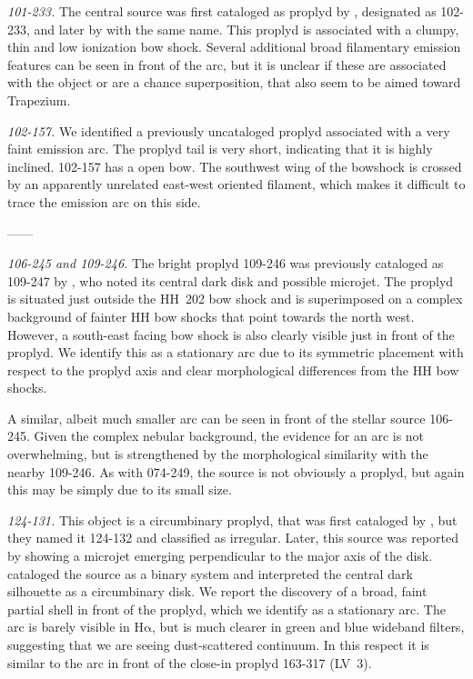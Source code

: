 \documentclass[iop, apj]{emulateapj}
\newcommand\ha{\ensuremath{\mathrm{H\alpha}}}
\begin{document}
\textit{101-233.} The central source was first cataloged as proplyd by \citet{ODell:1996a}, designated as 102-233, and later by \citet{Ricci:2008a} with the same name. This proplyd is associated with a clumpy, thin and low ionization bow shock. Several additional broad filamentary emission features can be seen in front of the arc, but it is unclear if these are associated with the object or are a chance superposition, that also seem to be aimed toward Trapezium. 

\textit{102-157.} We identified a previously uncataloged proplyd associated with a very faint emission arc. The proplyd tail is very short, indicating that it is highly inclined. 102-157 has a open bow. The southwest wing of the bowshock is crossed by an apparently unrelated east-west oriented filament, which makes it difficult to trace the emission arc on this side.

------

\textit{106-245 and 109-246.} The bright proplyd 109-246
\citep{Ricci:2008a} was previously cataloged as 109-247 by
\citet{Bally:2000a}, who noted its central dark disk and possible
microjet.  The proplyd is situated just outside the HH~202 bow shock
and is superimposed on a complex background of fainter HH bow shocks
that point towards the north west.  However, a
south-east facing bow shock is also clearly visible just in front of
the proplyd.  We identify this as a stationary arc due to its
symmetric placement with respect to the proplyd axis and clear
morphological differences from the HH bow shocks.

A similar, albeit much smaller arc can be seen in front of the stellar
source 106-245.  Given the complex nebular background, the evidence
for an arc is not overwhelming, but is strengthened by the
morphological similarity with the nearby 109-246.  As with 074-249, the
source is not obviously a proplyd, but again this may be simply due to
its small size.  


\textit{124-131.} This object is a circumbinary proplyd, that was
first cataloged by \citet{ODell:1996a}, but they named it 124-132 and
classified as irregular. Later, this source was reported by
\citet{Smith:2005a} showing a microjet emerging perpendicular to the
major axis of the disk. \citet{Ricci:2008a} cataloged the source as a
binary system and \citet{Robberto:2008a} interpreted the central dark
silhouette as a circumbinary disk.  We report the discovery of a
broad, faint partial shell in front of the proplyd, which we identify
as a stationary arc.  The arc is barely visible in \ha{}, but is much
clearer in green and blue wideband filters, suggesting that we are
seeing dust-scattered continuum.  In this respect it is similar to the
arc in front of the close-in proplyd 163-317 (LV~3).   
 
\end{document}
